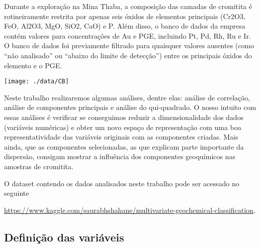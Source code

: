 \documentclass[
]{article}
\begin{document}
Durante a exploração na Mina Thaba, a composição das camadas de cromitita é rotineiramente restrita por apenas seis óxidos de elementos principais (Cr2O3, FeO, Al2O3, MgO, SiO2, CaO) e P. Além disso, o banco de dados da empresa contém valores para concentrações de Au e PGE, incluindo Pt, Pd, Rh, Ru e Ir. O banco de dados foi previamente filtrado para quaisquer valores ausentes (como ``não analisado'' ou ``abaixo do limite de detecção'') entre os principais óxidos do elemento e o PGE.

\begin{center}\texttt{[image: ./data/CB]} \end{center}

Neste trabalho realizaremos algumas análises, dentre elas: análise de correlação, análise de componentes principais e análise do qui-quadrado. O nosso intuito com essas análises é verificar se conseguimos reduzir a dimensionalidade dos dados (variáveis numéricas) e obter um novo espaço de representação com uma boa representatividade das variáveis originais com as componentes criadas. Mais ainda, que as componentes selecionadas, as que explicam parte importante da dispersão, consigam mostrar a influência dos componentes geoquímicos nas amostras de cromitita.

O dataset contendo os dados analisados neste trabalho pode ser acessado no seguinte

\url{https://www.kaggle.com/saurabhshahane/multivariate-geochemical-classification}.

\hypertarget{definiuxe7uxe3o-das-variuxe1veis}{%
\subsection*{Definição das variáveis}\label{definiuxe7uxe3o-das-variuxe1veis}}
\end{document}

